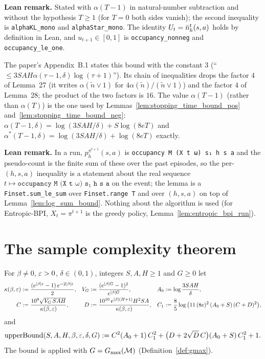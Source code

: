 \textbf{Lean remark.} Stated with $\alpha(T - 1)$ in natural-number subtraction and without the
hypothesis $T \ge 1$ (for $T = 0$ both sides vanish); the second inequality is \texttt{alphaKL\_mono}
and \texttt{alphaStar\_mono}. The identity $U_t = \bar{n}_h^t(s,a)$ holds by definition in Lean, and
$u_{t+1} \in [0,1]$ is \texttt{occupancy\_nonneg} and \texttt{occupancy\_le\_one}.

\begin{remark}\label{rem:sc_counting_constant}
The paper's Appendix~B.1 states this bound with the constant $3$ (``$\le 3SAH\alpha(\tau-1,\delta)\log(\tau+1)$'').
Its chain of inequalities drops the factor $4$ of Lemma~27 (it writes
$\alpha(\tilde n \vee 1)$ for $4\alpha(\tilde n)/(\tilde n \vee 1)$) and the factor $4$ of
Lemma~28; the product of the two factors is $16$. The value $\alpha(T-1)$ (rather than
$\alpha(T)$) is the one used by Lemmas~\ref{lem:stopping_time_bound_pos}
and~\ref{lem:stopping_time_bound_neg}: $\alpha(T-1,\delta) = \log(3SAH/\delta) + S\log(8eT)$
and $\alpha^*(T-1,\delta) = \log(3SAH/\delta) + \log(8eT)$ exactly.
\end{remark}

\textbf{Lean remark.} In a run, $p^{\pi^{t+1}}_h(s,a)$ is \texttt{occupancy M (X t ω) s₁ h s a}
and the pseudo-count is the finite sum of these over the past episodes, so the per-$(h,s,a)$
inequality is a statement about the real sequence $t \mapsto \texttt{occupancy M (X t ω) s₁ h s a}$
on the event; the lemma is a \texttt{Finset.sum\_le\_sum} over \texttt{Finset.range T} and over
$(h, s, a)$ on top of Lemma~\ref{lem:log_sum_bound}. Nothing about the algorithm is used
(for Entropic-BPI, $X_t = \pi^{t+1}$ is the greedy policy, Lemma~\ref{lem:entropic_bpi_run}).

\section{The sample complexity theorem}
\label{sec:sc_theorem}

\begin{definition}\label{def:upper_bound_const}
\leanok
{}
For $\beta \ne 0$, $\varepsilon > 0$, $\delta \in (0,1)$, integers $S, A, H \ge 1$ and $G \ge 0$ let
\begin{align*}
  \kappa(\beta,\varepsilon) &:= \frac{(e^{|\beta|\varepsilon} - 1)\,e^{-2|\beta|\varepsilon}}{2}, &
  V_G &:= \frac{(e^{|\beta| G} - 1)^2}{e^{|\beta| G}}, &
  A_0 &:= \log\frac{3SAH}{\delta}, \\
  C &:= \frac{10^9\sqrt{V_G\, S A H}}{\kappa(\beta,\varepsilon)}, &
  D &:= \frac{10^{10}\, e^{|\beta|(H+1)} H^2 S A}{\kappa(\beta,\varepsilon)}, &
  C_1 &:= \frac85\log\big(11\,(8e)^2\,(A_0 + S)\,(C + D)^2\big),
\end{align*}
and
\[
  \mathrm{upperBound}(S, A, H, \beta, \varepsilon, \delta, G) := C^2 (A_0 + 1)\, C_1^2 + \big(D + 2\sqrt{D}\, C\big)(A_0 + S)\, C_1^2 + 1 .
\]
The bound is applied with $G = G_{\max}(\mathcal M)$ (Definition~\ref{def:gmax}).
\end{definition}

